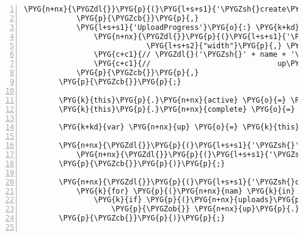 \begin{Verbatim}[commandchars=\\\{\},numbers=left,firstnumber=1,stepnumber=5]
                \PYG{n+nx}{\PYGZdl{}}\PYG{p}{(}\PYG{l+s+s1}{'\PYGZsh{}create\PYGZus{}form'}\PYG{p}{)}\PYG{p}{.}\PYG{n+nx}{submit}\PYG{p}{(}\PYG{p}{)}\PYG{p}{;}
            \PYG{p}{\PYGZcb{}}\PYG{p}{,}
            \PYG{l+s+s1}{'UploadProgress'}\PYG{o}{:} \PYG{k+kd}{function}\PYG{p}{(}\PYG{n+nx}{up}\PYG{p}{,} \PYG{n+nx}{up\PYGZus{}file}\PYG{p}{)} \PYG{p}{\PYGZob{}}
                \PYG{n+nx}{\PYGZdl{}}\PYG{p}{(}\PYG{l+s+s1}{'\PYGZsh{}'} \PYG{o}{+} \PYG{n+nx}{name} \PYG{o}{+} \PYG{l+s+s1}{'\PYGZus{}progress .bar'}\PYG{p}{)}\PYG{p}{.}\PYG{n+nx}{css}\PYG{p}{(}
                            \PYG{l+s+s2}{"width"}\PYG{p}{,} \PYG{n+nx}{up\PYGZus{}file}\PYG{p}{.}\PYG{n+nx}{percent} \PYG{o}{+} \PYG{l+s+s1}{'\PYGZpc{}'}\PYG{p}{)}\PYG{p}{;}
                \PYG{c+c1}{// \PYGZdl{}('\PYGZsh{}' + name + '\PYGZus{}progress .filestatus').text(}
                \PYG{c+c1}{//                             up\PYGZus{}file.percent + '\PYGZpc{}');}
            \PYG{p}{\PYGZcb{}}\PYG{p}{,}
        \PYG{p}{\PYGZcb{}}\PYG{p}{;}

        \PYG{k}{this}\PYG{p}{.}\PYG{n+nx}{active} \PYG{o}{=} \PYG{k+kc}{false}\PYG{p}{;}
        \PYG{k}{this}\PYG{p}{.}\PYG{n+nx}{complete} \PYG{o}{=} \PYG{k+kc}{false}\PYG{p}{;}

        \PYG{k+kd}{var} \PYG{n+nx}{up} \PYG{o}{=} \PYG{k}{this}\PYG{p}{.}\PYG{n+nx}{up} \PYG{o}{=} \PYG{k}{new} \PYG{n+nx}{plupload}\PYG{p}{.}\PYG{n+nx}{Uploader}\PYG{p}{(}\PYG{n+nx}{options}\PYG{p}{)}\PYG{p}{;}

        \PYG{n+nx}{\PYGZdl{}}\PYG{p}{(}\PYG{l+s+s1}{'\PYGZsh{}'} \PYG{o}{+} \PYG{n+nx}{name} \PYG{o}{+} \PYG{l+s+s1}{'\PYGZus{}progress'}\PYG{p}{)}\PYG{p}{.}\PYG{n+nx}{click}\PYG{p}{(}\PYG{k+kd}{function}\PYG{p}{(}\PYG{p}{)} \PYG{p}{\PYGZob{}}
            \PYG{n+nx}{\PYGZdl{}}\PYG{p}{(}\PYG{l+s+s1}{'\PYGZsh{}'} \PYG{o}{+} \PYG{n+nx}{name} \PYG{o}{+} \PYG{l+s+s1}{'\PYGZus{}browse'}\PYG{p}{)}\PYG{p}{.}\PYG{n+nx}{click}\PYG{p}{(}\PYG{p}{)}\PYG{p}{;}
        \PYG{p}{\PYGZcb{}}\PYG{p}{)}\PYG{p}{;}

        \PYG{n+nx}{\PYGZdl{}}\PYG{p}{(}\PYG{l+s+s1}{'\PYGZsh{}create\PYGZus{}form\PYGZus{}submit'}\PYG{p}{)}\PYG{p}{.}\PYG{n+nx}{click}\PYG{p}{(}\PYG{k+kd}{function}\PYG{p}{(}\PYG{p}{)} \PYG{p}{\PYGZob{}}
            \PYG{k}{for} \PYG{p}{(}\PYG{n+nx}{nam} \PYG{k}{in} \PYG{n+nx}{uploads}\PYG{p}{)}
                \PYG{k}{if} \PYG{p}{(}\PYG{n+nx}{uploads}\PYG{p}{[}\PYG{n+nx}{nam}\PYG{p}{]}\PYG{p}{.}\PYG{n+nx}{active}\PYG{p}{)}
                    \PYG{p}{\PYGZob{}} \PYG{n+nx}{up}\PYG{p}{.}\PYG{n+nx}{start}\PYG{p}{(}\PYG{p}{)}\PYG{p}{;} \PYG{k}{return} \PYG{k+kc}{false}\PYG{p}{;} \PYG{p}{\PYGZcb{}}
        \PYG{p}{\PYGZcb{}}\PYG{p}{)}\PYG{p}{;}


\end{Verbatim}
